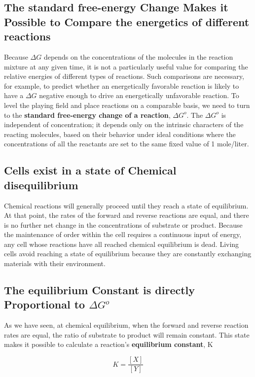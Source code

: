 \subsection{The standard free-energy Change Makes it Possible to Compare the energetics of different reactions}

Because $\Delta G$ depends on the concentrations of the molecules in the reaction
mixture at any given time, it is not a particularly useful value for
comparing the relative energies of different types of reactions. Such comparisons
are necessary, for example, to predict whether an energetically
favorable reaction is likely to have a $\Delta G$ negative enough to drive an
energetically unfavorable reaction. To level the playing field and place
reactions on a comparable basis, we need to turn to the \textbf{standard free-energy
change of a reaction}, $\Delta G^{o}$. The $\Delta G^{o}$ is independent of concentration; it
depends only on the intrinsic characters of the reacting molecules, based
on their behavior under ideal conditions where the concentrations of all
the reactants are set to the same fixed value of 1 mole/liter.

\subsection{Cells exist in a state of Chemical disequilibrium}

Chemical reactions will generally proceed until they reach a state of
equilibrium. At that point, the rates of the forward and reverse reactions
are equal, and there is no further net change in the concentrations of
substrate or product. Because the maintenance of order within the cell
requires a continuous input of energy, any cell whose reactions have all
reached chemical equilibrium is dead.
Living cells avoid reaching a state of equilibrium because they are constantly
exchanging materials with their environment.

\subsection{The equilibrium Constant is directly Proportional to $\Delta G^{o}$}

As we have seen, at chemical equilibrium, when the forward and reverse
reaction rates are equal, the ratio of substrate to product will remain constant.
This state makes it possible to calculate a reaction’s \textbf{equilibrium
constant}, K

\begin{equation}
K = \frac{[X]}{[Y]}
\end{equation}

